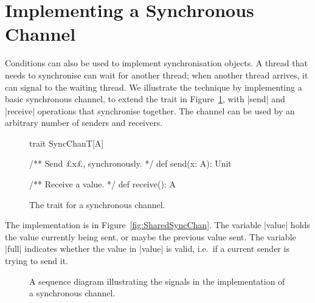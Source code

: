 \section{Implementing a Synchronous Channel}

Conditions can also be used to implement synchronisation objects.  A thread
that needs to synchronise can wait for another thread; when another thread
arrives, it can signal to the waiting thread.  We illustrate the technique by
implementing a basic synchronous channel, to extend the trait in
Figure~\ref{fig:SyncChanT}, with |send| and |receive| operations
that synchronise together.  The channel can be used by an arbitrary number of
senders and receivers.


\begin{figure}
\begin{scala}
trait SyncChanT[A]{
  /** Send £x£, synchronously. */
  def send(x: A): Unit

  /** Receive a value. */
  def receive(): A
}
\end{scala}
\caption{The trait for a synchronous channel.}
\label{fig:SyncChanT}
\end{figure}


The implementation is in Figure~\ref{fig:SharedSyncChan}.  The variable
|value| holds the value currently being sent, or maybe the previous value
sent.  The variable |full| indicates whether the value in |value| is valid,
i.e.~if a current sender is trying to send it. 


\begin{figure}
\begin{center}
\def\height{5.7}
\end{center}
\caption{A sequence diagram illustrating the signals in the implementation of
  a synchronous channel.}
\label{fig:syncChan-seqDiagram}
\end{figure}

